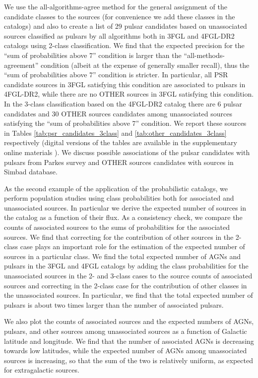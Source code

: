 \documentclass{aa}
\begin{document}
We use the all-algorithms-agree method for the general assignment of the candidate classes to the sources (for convenience we add these classes in the catalogs) and also to create a list of 29 pulsar candidates based on unassociated sources classified as pulsars by all algorithms both in 3FGL and 4FGL-DR2 catalogs using 2-class classification.
We find that the expected precision for the ``sum of probabilities above 7'' condition is larger than the ``all-methods-agreement'' condition (albeit at the expense of generally smaller recall), thus the ``sum of probabilities above 7'' condition is stricter.
In particular, all PSR candidate sources in 3FGL satisfying this condition are associated to pulsars in 4FGL-DR2, while there are no OTHER sources in 3FGL satisfying this condition. In the 3-class classification based on the 4FGL-DR2 catalog there are 6 pulsar candidates and 30 OTHER sources candidates among unassociated sources satisfying  the ``sum of probabilities above 7'' condition. 
We report these sources in Tables \ref{tab:psr_candidates_3class} and \ref{tab:other_candidates_3class} respectively (digital versions of the tables are available in the supplementary online materials \citep{SOM_material}). We discuss possible associations of the pulsar candidates with pulsars from Parkes survey \citep{Camilo2015} and OTHER sources candidates with sources in Simbad database.

As the second example of the application of the probabilistic catalogs, we perform population studies using class probabilities both for associated and unassociated sources.
In particular we derive the expected number of sources in the catalog as a function of their flux.
As a consistency check, we compare the counts of associated sources to the sums of probabilities for the associated sources.
We find that correcting for the contribution of other sources in the 2-class case plays an important role for the estimation of the expected number of sources in a particular class.
We find the total expected number of AGNs and pulsars in the 3FGL and 4FGL catalogs by adding the class probabilities for the unassociated sources in the 2- and 3-class cases to the source counts of associated sources and correcting in the 2-class case for the contribution of other classes in the unassociated sources.
In particular, we find that the total expected number of pulsars is about two times larger than the number of associated pulsars.

We also plot the counts of associated sources and the expected numbers of AGNs, pulsars, and other sources among unassociated sources
as a function of Galactic latitude and longitude.
We find that the number of associated AGNs is decreasing towards low latitudes, while the expected number of AGNs among unassociated sources is increasing, so that the sum of the two is relatively uniform, as expected for extragalactic sources.
\end{document}

